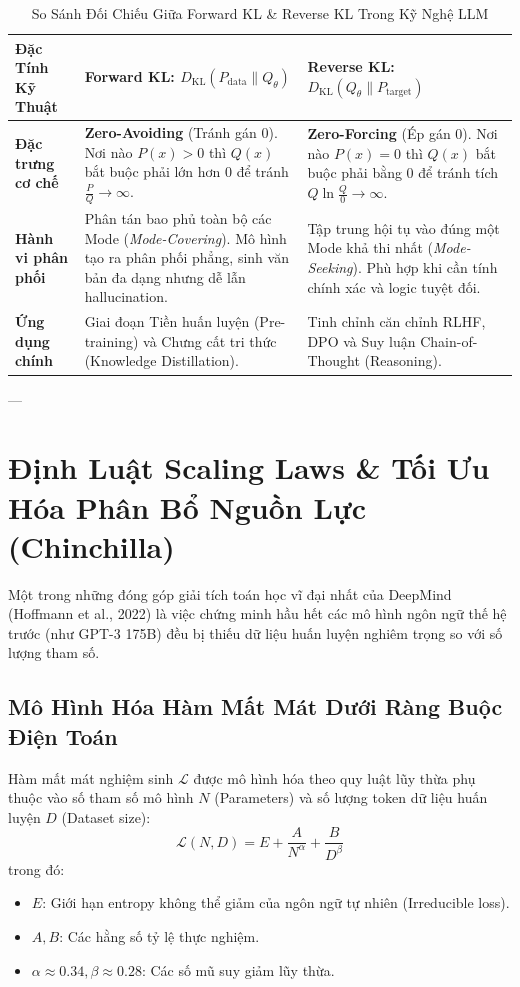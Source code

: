 \begin{table}[htbp]
\centering
\small
\caption{So Sánh Đối Chiếu Giữa Forward KL \& Reverse KL Trong Kỹ Nghệ LLM}
\label{tab:app-kl-comparison}
\begin{tabular}{p{3.5cm}p{4.5cm}p{5.0cm}}
\toprule
\textbf{Đặc Tính Kỹ Thuật} & \textbf{Forward KL: $D_{\text{KL}}(P_{\text{data}} \parallel Q_\theta)$} & \textbf{Reverse KL: $D_{\text{KL}}(Q_\theta \parallel P_{\text{target}})$} \\
\midrule
\textbf{Đặc trưng cơ chế} & \textbf{Zero-Avoiding} (Tránh gán 0). Nơi nào $P(x) > 0$ thì $Q(x)$ bắt buộc phải lớn hơn 0 để tránh $\frac{P}{Q} \to \infty$. & \textbf{Zero-Forcing} (Ép gán 0). Nơi nào $P(x) = 0$ thì $Q(x)$ bắt buộc phải bằng 0 để tránh tích $Q \ln \frac{Q}{0} \to \infty$. \\
\textbf{Hành vi phân phối} & Phân tán bao phủ toàn bộ các Mode (\textit{Mode-Covering}). Mô hình tạo ra phân phối phẳng, sinh văn bản đa dạng nhưng dễ lẫn hallucination. & Tập trung hội tụ vào đúng một Mode khả thi nhất (\textit{Mode-Seeking}). Phù hợp khi cần tính chính xác và logic tuyệt đối. \\
\textbf{Ứng dụng chính} & Giai đoạn Tiền huấn luyện (Pre-training) và Chưng cất tri thức (Knowledge Distillation). & Tinh chỉnh căn chỉnh RLHF, DPO và Suy luận Chain-of-Thought (Reasoning). \\
\bottomrule
\end{tabular}
\end{table}

---

\section{Định Luật Scaling Laws \& Tối Ưu Hóa Phân Bổ Nguồn Lực (Chinchilla)}
\label{sec:app-math-scaling-laws}

Một trong những đóng góp giải tích toán học vĩ đại nhất của DeepMind (Hoffmann et al., 2022) là việc chứng minh hầu hết các mô hình ngôn ngữ thế hệ trước (như GPT-3 175B) đều bị thiếu dữ liệu huấn luyện nghiêm trọng so với số lượng tham số.

\subsection{Mô Hình Hóa Hàm Mất Mát Dưới Ràng Buộc Điện Toán}

Hàm mất mát nghiệm sinh $\mathcal{L}$ được mô hình hóa theo quy luật lũy thừa phụ thuộc vào số tham số mô hình $N$ (Parameters) và số lượng token dữ liệu huấn luyện $D$ (Dataset size):
\begin{equation}
\mathcal{L}(N, D) = E + \frac{A}{N^\alpha} + \frac{B}{D^\beta}
\end{equation}
trong đó:
\begin{itemize}
  \item $E$: Giới hạn entropy không thể giảm của ngôn ngữ tự nhiên (Irreducible loss).
  \item $A, B$: Các hằng số tỷ lệ thực nghiệm.
  \item $\alpha \approx 0.34, \beta \approx 0.28$: Các số mũ suy giảm lũy thừa.
\end{itemize}

